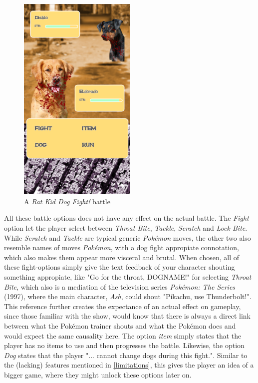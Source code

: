 \begin{figure}[h!]
	\centering
    \includegraphics[width=0.5\textwidth]{battle.png}
    \caption{A \textit{Rat Kid Dog Fight!} battle}
    \label{fig:DogFightBattle}
\end{figure}

All these battle options does not have any effect on the actual battle. The \textit{Fight} option let the player select between \textit{Throat Bite}, \textit{Tackle}, \textit{Scratch} and \textit{Lock Bite}. While \textit{Scratch} and \textit{Tackle} are typical generic \textit{Pokémon} moves, the other two also resemble names of moves \textit{Pokémon}, with a dog fight appropiate connotation, which also makes them appear more visceral and brutal. When chosen, all of these fight-options simply give the text feedback of your character shouting something appropiate, like "Go for the throat, DOGNAME!" for selecting \textit{Throat Bite}, which also is a mediation of the television series \textit{Pokémon: The Series} (1997), where the main character, \textit{Ash}, could shout "Pikachu, use Thunderbolt!". This reference further creates the expectance of an actual effect on gameplay, since those familiar with the show, would know that there is always a direct link between what the Pokémon trainer shouts and what the Pokémon does and would expect the same causality here.
The option \textit{item} simply states that the player has no items to use and then progresses the battle. Likewise, the option \textit{Dog} states that the player "... cannot change dogs during this fight.". Similar to the (lacking) features mentioned in \ref{limitations}, this gives the player an idea of a bigger game, where they might unlock these options later on.\

